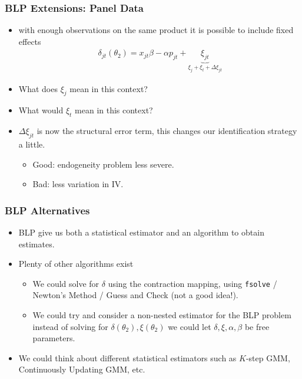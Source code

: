 \documentclass[aspectratio=169,10pt]{beamer}
\begin{document}
\begin{frame}
\frametitle{BLP Extensions: Panel Data}
\begin{itemize}
\item with enough observations on the same product it is possible to include fixed effects
\begin{align*}
\delta_{jt}(\theta_2) = x_{jt} \beta - \alpha p_{jt} + \underbrace{\xi_{jt}}_{\xi_{j} + \xi_t + \Delta \xi_{jt}}
\end{align*}
\item What does $\xi_{j}$ mean in this context?
\item What would $\xi_t$ mean in this context?
\item $\Delta \xi_{jt}$ is now the structural error term, this changes our identification strategy a little. 
\begin{itemize}
\item Good: endogeneity problem less severe.
\item Bad: less variation in IV.
\end{itemize}
\end{itemize}
\end{frame}


 \begin{frame}
\frametitle{BLP Alternatives}
\begin{itemize}
 \item BLP give us both a statistical \alert{estimator} and an \alert{algorithm} to obtain estimates.
\item Plenty of other algorithms exist
\begin{itemize}
\item We could solve for $\delta$ using the contraction mapping, using \texttt{fsolve} / Newton's Method / Guess and Check (not a good idea!).
\item We could try and consider a non-nested estimator for the BLP problem instead of solving for $\delta(\theta_2),\xi(\theta_2)$ we could let $\delta,\xi,\alpha,\beta$ be free parameters.
 \end{itemize}
\item We could think about different statistical estimators such as $K$-step GMM, Continuously Updating GMM, etc.
 \end{itemize}
\end{frame}
\end{document}
